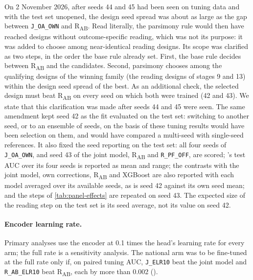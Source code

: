 On 2 November 2026, after seeds 44 and 45 had been seen on tuning data and with
the test set unopened, the design seed spread was about as large as the gap
between \texttt{J\_OA\_OWN} and R\textsubscript{AB}. Read literally, the
parsimony rule would then have reached designs without outcome-specific
reading, which was not its purpose: it was added to choose among near-identical
reading designs. Its scope was clarified as two steps, in the order the base
rule already set. First, the base rule decides between R\textsubscript{AB} and
the candidates. Second, parsimony chooses among the qualifying designs of the
winning family (the reading designs of stages 9 and 13) within the design seed
spread of the best. As an additional check, the selected design must beat
R\textsubscript{AB} on every seed on which both were trained (42 and 43). We
state that this clarification was made after seeds 44 and 45 were seen. The same
amendment kept seed 42 as the fit evaluated on the test set: switching to
another seed, or to an ensemble of seeds, on the basis of these tuning results
would have been selection on them, and would have compared a multi-seed \opera{}
with single-seed references. It also fixed the seed reporting on the test set:
all four seeds of \texttt{J\_OA\_OWN}, and seed 43 of the joint model,
R\textsubscript{AB} and \texttt{R\_PF\_OFF}, are scored; \opera{}'s test AUC
over its four seeds is reported as mean and range; the contrasts with the joint
model, own corrections, R\textsubscript{AB} and XGBoost are also reported with
each model averaged over its available seeds, as is seed 42 against its own seed
mean; and the steps of \cref{tab:panel-effects} are repeated on seed 43. The
expected size of the reading step on the test set is its seed average, not its
value on seed 42.

\paragraph{Encoder learning rate.} Primary analyses use the encoder at 0.1
times the head's learning rate for every arm; the full rate is a sensitivity
analysis. The national arm was to be fine-tuned at the full rate only if, on
paired tuning AUC, \texttt{J\_ELR10} beat the joint model and
\texttt{R\_AB\_ELR10} beat R\textsubscript{AB}, each by more than 0.002
().

